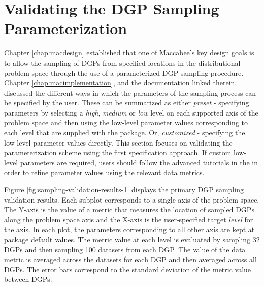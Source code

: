 \documentclass[../main.tex]{subfiles}
\begin{document}
\section{Validating the DGP Sampling Parameterization}
\label{sec:validation-dgp-sampling}

Chapter \ref{chap:macdesign} established that one of Maccabee's key design goals is to allow the sampling of DGPs from specified locations in the distributional problem space through the use of a parameterized DGP sampling procedure. Chapter \ref{chap:macimplementation}, and the documentation linked therein, discussed the different ways in which the parameters of the sampling process can be specified by the user. These can be summarized as either \textit{preset} - specifying parameters by selecting a \textit{high}, \textit{medium} or \textit{low} level on each supported axis of the problem space and then using the low-level parameter values corresponding to each level that are supplied with the package. Or, \textit{customized} - specifying the low-level parameter values directly. This section focuses on validating the parameterization scheme using the first specification approach. If custom low-level parameters are required, users should follow the advanced tutorials in the  in order to refine parameter values using the relevant data metrics.

\vspace{\baselineskip}

Figure \ref{fig:sampling-validation-results-1} displays the primary DGP sampling validation results. Each subplot corresponds to a single axis of the problem space. The Y-axis is the value of a metric that measures the location of sampled DGPs along the problem space axis and the X-axis is the user-specified target \textit{level} for the axis. In each plot, the parameters corresponding to all other axis are kept at package default values. The metric value at each level is evaluated by sampling 32 DGPs and then sampling 100 datasets from each DGP. The value of the data metric is averaged across the datasets for each DGP and then averaged across all DGPs. The error bars correspond to the standard deviation of the metric value between DGPs.
\end{document}

